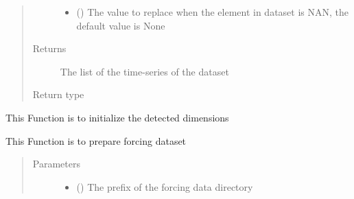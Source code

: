 \documentclass[letterpaper,10pt,english]{sphinxmanual}
\begin{document}
\begin{fulllineitems}
\begin{fulllineitems}
\begin{quote}
\begin{description}
\begin{itemize}
\item {} 
 () \textendash{} The value to replace when the element in dataset is NAN, the default value is None

\end{itemize}

\item[{Returns}] \leavevmode
The list of the time-series of the dataset

\item[{Return type}] \leavevmode
{}

\end{description}\end{quote}

\end{fulllineitems}


\begin{fulllineitems}
\label{\detokenize{AgentTools.GenericModelAgent:AgentTools.GenericModelAgent.ForcingDataFileGenerator.ForcingDataFileGenerator.initialize_dimensions}}
This Function is to initialize the detected dimensions

\end{fulllineitems}


\begin{fulllineitems}
\label{\detokenize{AgentTools.GenericModelAgent:AgentTools.GenericModelAgent.ForcingDataFileGenerator.ForcingDataFileGenerator.prepare_forcing}}
This Function is to prepare forcing dataset
\begin{quote}\begin{description}
\item[{Parameters}] \leavevmode\begin{itemize}
\item {} 
 () \textendash{} The prefix of the forcing data directory


\end{itemize}
\end{description}
\end{quote}
\end{fulllineitems}
\end{fulllineitems}
\end{document}
